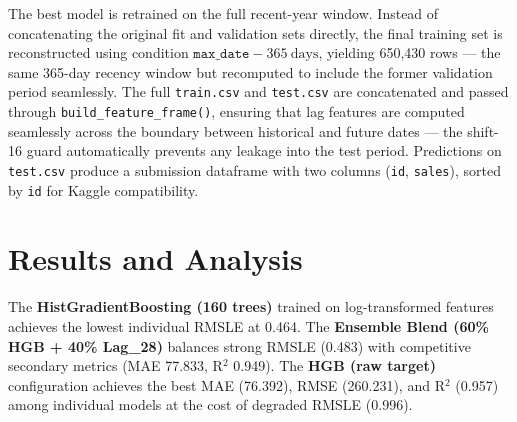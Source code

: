 The best model is retrained on the full recent-year window. Instead of concatenating the original fit and validation sets directly, the final training set is reconstructed using condition $\texttt{max\_date} - 365\ \text{days}$, yielding 650,430 rows — the same 365-day recency window but recomputed to include the former validation period seamlessly. The full \texttt{train.csv} and \texttt{test.csv} are concatenated and passed through \texttt{build\_feature\_frame()}, ensuring that lag features are computed seamlessly across the boundary between historical and future dates — the shift-16 guard automatically prevents any leakage into the test period. Predictions on \texttt{test.csv} produce a submission dataframe with two columns (\texttt{id}, \texttt{sales}), sorted by \texttt{id} for Kaggle compatibility.

\section{Results and Analysis}

\begin{resultbox}
The \textbf{HistGradientBoosting (160 trees)} trained on log-transformed features achieves the lowest individual RMSLE at 0.464. The \textbf{Ensemble Blend (60\% HGB + 40\% Lag\_28)} balances strong RMSLE (0.483) with competitive secondary metrics (MAE 77.833, R$^2$ 0.949). The \textbf{HGB (raw target)} configuration achieves the best MAE (76.392), RMSE (260.231), and R$^2$ (0.957) among individual models at the cost of degraded RMSLE (0.996).
\end{resultbox}

